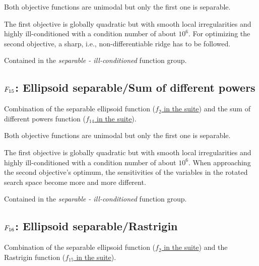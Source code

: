 Both objective functions are unimodal but only the first one is
separable.

The first objective is globally quadratic but with smooth local
irregularities and highly ill-conditioned with a condition number of
about \(10^6\). For optimizing the second objective, a sharp,
i.e., non-differentiable ridge has to be followed.

Contained in the \emph{separable - ill-conditioned} function group.



\subsection[\texorpdfstring{\protect\(F_{15}\protect\): Ellipsoid separable/Sum of different powers}{F15: Ellipsoid separable/Sum of different powers}]{\texorpdfstring{\protect\(F_{15}\protect\): Ellipsoid separable/Sum of different powers}{}}
\label{index:ellipsoid-separable-sum-of-different-powers}\label{index:f15}
Combination of the separable ellipsoid function (\href{https://coco.gforge.inria.fr/downloads/download16.00/bbobdocfunctions.pdf\#page=10}{\(f_2\) in the \bbob suite}) and the sum of different powers function
(\href{https://coco.gforge.inria.fr/downloads/download16.00/bbobdocfunctions.pdf\#page=70}{\(f_{14}\) in the \bbob suite}).

Both objective functions are unimodal but only the first one is
separable.

The first objective is globally quadratic but with smooth local
irregularities and highly ill-conditioned with a condition number of
about \(10^6\). When approaching the second objective's optimum,
the sensitivities of the variables in the rotated search space become
more and more different.

Contained in the \emph{separable - ill-conditioned} function group.



\subsection[\texorpdfstring{\protect\(F_{16}\protect\): Ellipsoid separable/Rastrigin}{F16: Ellipsoid separable/Rastrigin}]{\texorpdfstring{\protect\(F_{16}\protect\): Ellipsoid separable/Rastrigin}{}}
\label{index:ellipsoid-separable-rastrigin}\label{index:f16}
Combination of the separable ellipsoid function (\href{https://coco.gforge.inria.fr/downloads/download16.00/bbobdocfunctions.pdf\#page=10}{\(f_2\) in the \bbob suite}) and the Rastrigin function (\href{https://coco.gforge.inria.fr/downloads/download16.00/bbobdocfunctions.pdf\#page=75}{\(f_{15}\) in the \bbob suite}).

